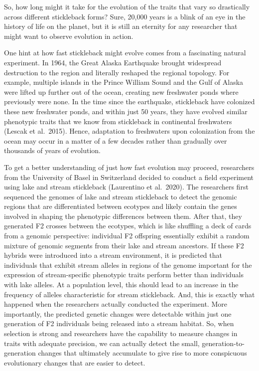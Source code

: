 \documentclass[
]{book}
\begin{document}
So, how long might it take for the evolution of the traits that vary so drastically across different stickleback forms? Sure, 20,000 years is a blink of an eye in the history of life on the planet, but it is still an eternity for any researcher that might want to observe evolution in action.

One hint at how fast stickleback might evolve comes from a fascinating natural experiment. In 1964, the Great Alaska Earthquake brought widespread destruction to the region and literally reshaped the regional topology. For example, multiple islands in the Prince William Sound and the Gulf of Alaska were lifted up further out of the ocean, creating new freshwater ponds where previously were none. In the time since the earthquake, stickleback have colonized these new freshwater ponds, and within just 50 years, they have evolved similar phenotypic traits that we know from stickleback in continental freshwaters (Lescak et al.~2015). Hence, adaptation to freshwaters upon colonization from the ocean may occur in a matter of a few decades rather than gradually over thousands of years of evolution.

To get a better understanding of just how fast evolution may proceed, researchers from the University of Basel in Switzerland decided to conduct a field experiment using lake and stream stickleback (Laurentino et al.~2020). The researchers first sequenced the genomes of lake and stream stickleback to detect the genomic regions that are differentiated between ecotypes and likely contain the genes involved in shaping the phenotypic differences between them. After that, they generated F2 crosses between the ecotypes, which is like shuffling a deck of cards from a genomic perspective: individual F2 offspring essentially exhibit a random mixture of genomic segments from their lake and stream ancestors. If these F2 hybrids were introduced into a stream environment, it is predicted that individuals that exhibit stream alleles in regions of the genome important for the expression of stream-specific phenotypic traits perform better than individuals with lake alleles. At a population level, this should lead to an increase in the frequency of alleles characteristic for stream stickleback. And, this is exactly what happened when the researchers actually conducted the experiment. More importantly, the predicted genetic changes were detectable within just one generation of F2 individuals being released into a stream habitat. So, when selection is strong and researchers have the capability to measure changes in traits with adequate precision, we can actually detect the small, generation-to-generation changes that ultimately accumulate to give rise to more conspicuous evolutionary changes that are easier to detect.
\end{document}
